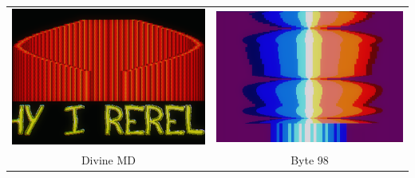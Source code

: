 \documentclass{beamer}
\begin{document}
\begin{frame}
\begin{columns}
\begin{column}{.62\linewidth}
{\begin{tabular}{@{}cc@{}}
	  \includegraphics[width=0.45\linewidth]{imgs/demo_divin} &
	  \includegraphics[width=0.45\linewidth]{imgs/demo_byte}
	  \\

	  Divine MD & Byte 98 \\

	\end{tabular}
	}


\end{column}
\end{columns}
\end{frame}
\end{document}
